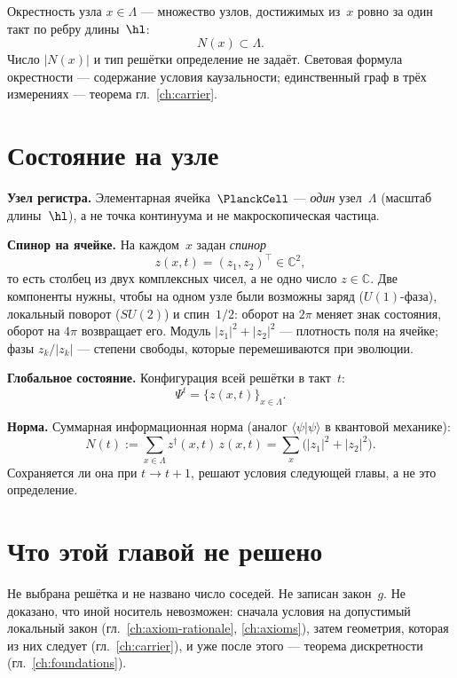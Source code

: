 \begin{definition}
\label{def:neighborhood}
Окрестность узла $x\in\Lambda$ --- множество узлов, достижимых из~$x$
ровно за один такт по ребру длины~$\hl$:
\[
  N(x)\subset\Lambda.
\]
Число $|N(x)|$ и тип решётки определение не задаёт.
Световая формула окрестности --- содержание условия каузальности;
единственный граф в трёх измерениях --- теорема гл.~\ref{ch:carrier}.
\end{definition}

\section{Состояние на узле}
\label{sec:state-on-carrier}

\begin{definition}
\label{def:field-a3}
\textbf{Узел регистра.}
Элементарная ячейка~$\PlanckCell$ --- \emph{один} узел~$\Lambda$
(масштаб длины~$\hl$), а не точка континуума и не макроскопическая частица.

\textbf{Спинор на ячейке.}
На каждом~$x$ задан \emph{спинор}
\[
  z(x,t)=(z_1,z_2)^\top\in\mathbb{C}^2,
\]
то есть столбец из двух комплексных чисел, а не одно число $z\in\mathbb{C}$.
Две компоненты нужны, чтобы на одном узле были возможны заряд ($U(1)$-фаза),
локальный поворот ($SU(2)$) и спин~$1/2$:
оборот на $2\pi$ меняет знак состояния, оборот на $4\pi$ возвращает его.
Модуль $|z_1|^2+|z_2|^2$ --- плотность поля на ячейке;
фазы $z_k/|z_k|$ --- степени свободы, которые перемешиваются при эволюции.

\textbf{Глобальное состояние.}
Конфигурация всей решётки в такт~$t$:
\[
  \Psi^t=\{z(x,t)\}_{x\in\Lambda}.
\]

\textbf{Норма.}
Суммарная информационная норма (аналог $\langle\psi|\psi\rangle$ в квантовой механике):
\[
  N(t):=\sum_{x\in\Lambda} z^\dagger(x,t)\,z(x,t)=\sum_x\bigl(|z_1|^2+|z_2|^2\bigr).
\]
Сохраняется ли она при $t\to t+1$, решают условия следующей главы, а не это определение.
\end{definition}

\section{Что этой главой не решено}

Не выбрана решётка и не названо число соседей.
Не записан закон~$g$.
Не доказано, что иной носитель невозможен:
сначала условия на допустимый локальный закон
(гл.~\ref{ch:axiom-rationale}, \ref{ch:axioms}),
затем геометрия, которая из них следует (гл.~\ref{ch:carrier}),
и уже после этого --- теорема дискретности (гл.~\ref{ch:foundations}).
